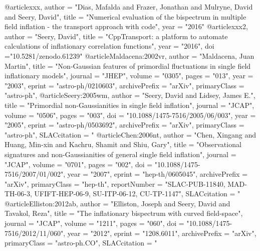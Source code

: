 @article{xxx, 
 author     =  "Dias, Mafalda and Frazer, Jonathan
                        and Mulryne, David and Seery, David",
title          =  "Numerical evaluation of the bispectrum in multiple field inflation
- the transport approach with code",
year = "2016"
}
@article{xxx2, 
author = "Seery, David",
title = "CppTransport: a platform to automate calculations of inflationary correlation functions",
year = "2016",
doi ="10.5281/zenodo.61239"
}
@article{Maldacena:2002vr,
      author         = "Maldacena, Juan Martin",
      title          = "{Non-Gaussian features of primordial fluctuations in
                        single field inflationary models}",
      journal        = "JHEP",
      volume         = "0305",
      pages          = "013",
      year           = "2003",
      eprint         = "astro-ph/0210603",
      archivePrefix  = "arXiv",
      primaryClass   = "astro-ph",
}
@article{Seery:2005wm,
      author         = "Seery, David and Lidsey, James E.",
      title          = "{Primordial non-Gaussianities in single field inflation}",
      journal        = "JCAP",
      volume         = "0506",
      pages          = "003",
      doi            = "10.1088/1475-7516/2005/06/003",
      year           = "2005",
      eprint         = "astro-ph/0503692",
      archivePrefix  = "arXiv",
      primaryClass   = "astro-ph",
      SLACcitation   = "%
}
@article{Chen:2006nt,
      author         = "Chen, Xingang and Huang, Min-xin and Kachru, Shamit and
                        Shiu, Gary",
      title          = "{Observational signatures and non-Gaussianities of
                        general single field inflation}",
      journal        = "JCAP",
      volume         = "0701",
      pages          = "002",
      doi            = "10.1088/1475-7516/2007/01/002",
      year           = "2007",
      eprint         = "hep-th/0605045",
      archivePrefix  = "arXiv",
      primaryClass   = "hep-th",
      reportNumber   = "SLAC-PUB-11840, MAD-TH-06-3, UFIFT-HEP-06-9,
                        SU-ITP-06-12, CU-TP-1147",
      SLACcitation   = "%
}
@article{Elliston:2012ab,
      author         = "Elliston, Joseph and Seery, David and Tavakol, Reza",
      title          = "{The inflationary bispectrum with curved field-space}",
      journal        = "JCAP",
      volume         = "1211",
      pages          = "060",
      doi            = "10.1088/1475-7516/2012/11/060",
      year           = "2012",
      eprint         = "1208.6011",
      archivePrefix  = "arXiv",
      primaryClass   = "astro-ph.CO",
      SLACcitation   = "%
}
